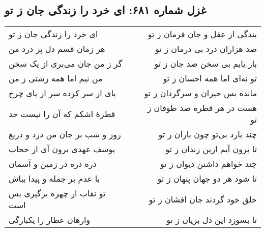 \begin{center}
\section*{غزل شماره ۶۸۱: ای خرد را زندگی جان ز تو}
\label{sec:681}
\begin{longtable}{l p{0.5cm} r}
ای خرد را زندگی جان ز تو
&&
بندگی از عقل و جان فرمان ز تو
\\
هر زمان قسم دل پر درد من
&&
صد هزاران درد بی درمان ز تو
\\
گر ز من جان می‌بری از یک سخن
&&
باز یابم بی سخن صد جان ز تو
\\
من نیم اما همه زشتی ز من
&&
تو نه‌ای اما همه احسان ز تو
\\
پای از سر کرده سر از پای چرخ
&&
مانده بس حیران و سرگردان ز تو
\\
قطرهٔ اشکم که آن را نیست حد
&&
هست در هر قطره صد طوفان ز تو
\\
روز و شب بر جان من درد و دریغ
&&
چند بارد بی‌تو چون باران ز تو
\\
یوسف عهدی برون آی از حجاب
&&
تا برون آیم ازین زندان ز تو
\\
ذره ذره در زمین و آسمان
&&
چند خواهم داشتن دیوان ز تو
\\
با عدم بر جمله و پیدا بباش
&&
تا شود هر دو جهان پنهان ز تو
\\
تو نقاب از چهره برگیری بس است
&&
خلق خود گردند جان افشان ز تو
\\
وارهان عطار را یکبارگی
&&
تا بسوزد این دل بریان ز تو
\\
\end{longtable}
\end{center}
